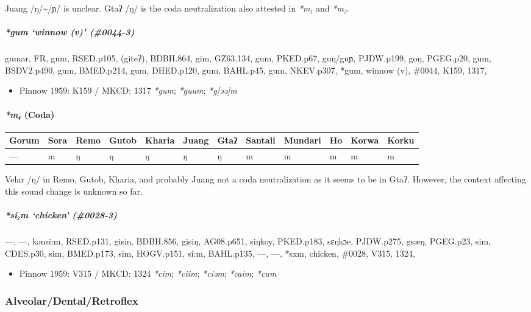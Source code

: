 \documentclass[a4paper,]{article}
\providecommand{\tightlist}{%
  \setlength{\itemsep}{0pt}\setlength{\parskip}{0pt}}
\let\oldparagraph\paragraph
\renewcommand{\paragraph}[1]{\oldparagraph{#1}\mbox{}}
\let\oldsubparagraph\subparagraph
\renewcommand{\subparagraph}[1]{\oldsubparagraph{#1}\mbox{}}
\begin{document}
Juang /ŋ/\textasciitilde{}/ɲ/ is unclear. Gtaʔ /ŋ/ is the coda
neutralization also attested in \emph{*m₁} and \emph{*m₂}.

\subparagraph{\texorpdfstring{\emph{*gum} `winnow (v)'
(\#0044-3)}{*gum winnow (v) (\#0044-3)}}\label{gum-winnow-v-0044-3}

gumar, FR, gum, RSED.p105, (giteʔ), BDBH.864, gim, GZ63.134, gum,
PKED.p67, guŋ/guɲ, PJDW.p199, goŋ, PGEG.p20, gum, BSDV2.p490, gum,
BMED.p214, gum, DHED.p120, gum, BAHL.p45, gum, NKEV.p307, *gum, winnow
(v), \#0044, K159, 1317,

\begin{itemize}
\tightlist
\item
  Pinnow 1959: K159 / MKCD: 1317 \emph{*gum}; \emph{*guum};
  \emph{*g{[}əə{]}m}
\end{itemize}

\paragraph{\texorpdfstring{\emph{*m₄}
(Coda)}{*m₄ (Coda)}}\label{m-coda-3}

\begin{longtable}[]{@{}llllllllllll@{}}
\toprule
Gorum & Sora & Remo & Gutob & Kharia & Juang & Gtaʔ & Santali & Mundari
& Ho & Korwa & Korku\tabularnewline
\midrule
\endhead
--- & m & ŋ & ŋ & ŋ & ŋ & ŋ & m & m & m & m & m\tabularnewline
\bottomrule
\end{longtable}

Velar /ŋ/ in Remo, Gutob, Kharia, and probably Juang not a coda
neutralization as it seems to be in Gtaʔ. However, the context affecting
this sound change is unknown so far.

\subparagraph{\texorpdfstring{\emph{*si₂m} `chicken'
(\#0028-3)}{*si₂m chicken (\#0028-3)}}\label{sim-chicken-0028-3}

---, ---, kənsi:m, RSED.p131, gisiŋ, BDBH.856, gisiŋ, AG08.p651, siŋkoy,
PKED.p183, sɛŋkɔe, PJDW.p275, gsæŋ, PGEG.p23, sim, CDES.p30, sim,
BMED.p173, sim, HOGV.p151, si:m, BAHL.p135, ---, ---, *sxm, chicken,
\#0028, V315, 1324,

\begin{itemize}
\tightlist
\item
  Pinnow 1959: V315 / MKCD: 1324 \emph{*cim}; \emph{*ciim};
  \emph{*ciəm}; \emph{*caim}; \emph{*cum}
\end{itemize}

\subsubsection{Alveolar/Dental/Retroflex}\label{alveolardentalretroflex}
\end{document}
